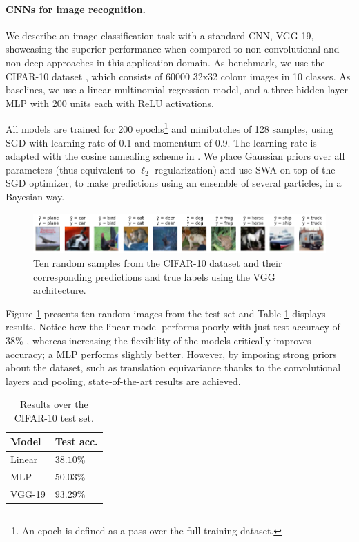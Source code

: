 \paragraph{CNNs for image recognition.}\label{kkvision}

We describe an image classification task with a standard CNN, VGG-19, showcasing the superior performance when compared to non-convolutional and non-deep approaches in this application domain. As benchmark, we use the CIFAR-10 dataset \parencite{krizhevsky2014cifar},
which consists of 60000 32x32 colour images in 10 classes. As baselines, we use a linear multinomial regression model, and a three hidden layer MLP with 200 units each with ReLU activations.

All models are trained for 200 epochs\footnote{An epoch is defined as a pass over the full training dataset.} and minibatches of 128 samples, using SGD with learning rate of 0.1 and  momentum of 0.9.
The learning rate is adapted with the cosine annealing scheme in  \parencite{loshchilov2016sgdr}. We place Gaussian priors over all parameters (thus equivalent to $\ell_2$ regularization) and use SWA on top of the SGD optimizer, to make predictions using an ensemble of several particles, in a Bayesian way.

\begin{figure}[hbt]
\centering
  \includegraphics[width=1.\linewidth]{figures/cifar.png}
  \caption{Ten random samples from the CIFAR-10 dataset and their corresponding predictions and true labels using the VGG architecture.}
  \label{fig:cifar}
\end{figure}

Figure \ref{fig:cifar} presents ten random images from the test set
and Table \ref{tab:cnn} displays results. Notice how the linear model performs poorly with just test accuracy of 38\% , whereas increasing the flexibility of the models critically improves 
accuracy; a MLP performs slightly better.
However, by imposing strong priors about the dataset, such as translation equivariance thanks to the convolutional layers and pooling, state-of-the-art results are achieved.

\begin{table}[ht]
\caption{Results over the CIFAR-10 test set.}
\centering
\begin{tabular}{ll}
Model & Test acc. \\
\hline
Linear &  $38.10\%$ \\
MLP &  $50.03\%$\\
VGG-19 &  $93.29\%$ 
\end{tabular}
\label{tab:cnn}
\end{table}


